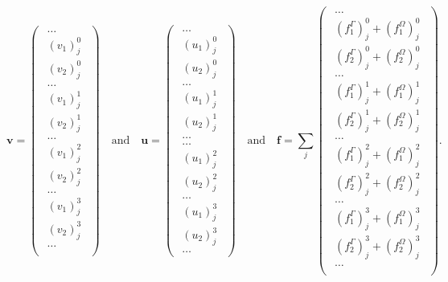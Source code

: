 \begin{equation}
    \mathbf{v} = 
    \begin{pmatrix}
    \begin{smallmatrix}
        \dots \\ (v_1)^0_j \\ (v_2)^0_j \\ \dots \\ (v_1)^1_j \\ (v_2)^1_j \\ \dots \\ (v_1)^2_j \\ (v_2)^2_j \\ \dots \\ (v_1)^3_j \\ (v_2)^3_j \\ \dots \\
    \end{smallmatrix}
    \end{pmatrix}
    \quad
    \text{and}
    \quad
    \mathbf{u} =
    \begin{pmatrix}
    \begin{smallmatrix}
        \dots \\ (u_1)^0_j \\ (u_2)^0_j \\ \dots \\ (u_1)^1_j \\ (u_2)^1_j \\ \dots \\
        \dots \\ (u_1)^2_j \\ (u_2)^2_j \\ \dots \\ (u_1)^3_j \\ (u_2)^3_j \\ \dots
    \end{smallmatrix}
    \end{pmatrix}
    \quad
    \text{and}
    \quad
    \mathbf{f} = 
    \sum_j
    \begin{pmatrix}
    \begin{smallmatrix}
        \dots \\ (f^\Gamma_1)^0_j + (f^\Omega_1)^0_j \\ (f^\Gamma_2)^0_j + (f^\Omega_2)^0_j \\ \dots \\ (f^\Gamma_1)^1_j + (f^\Omega_1)^1_j \\ (f^\Gamma_2)^1_j + (f^\Omega_2)^1_j\\ \dots \\ (f^\Gamma_1)^2_j + (f^\Omega_1)^2_j \\ (f^\Gamma_2)^2_j + (f^\Omega_2)^2_j \\ \dots \\ (f^\Gamma_1)^3_j + (f^\Omega_1)^3_j \\ (f^\Gamma_2)^3_j + (f^\Omega_2)^3_j \\ \dots \\
    \end{smallmatrix}
    \end{pmatrix}.
\end{equation}
